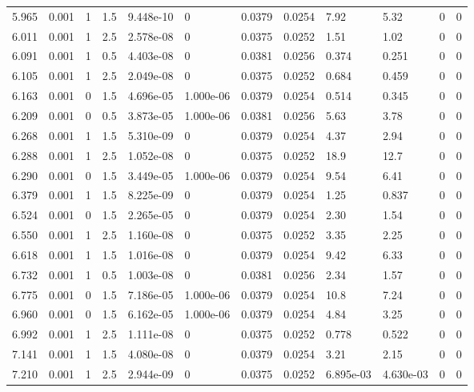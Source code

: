 \documentclass[preview]{standalone}
\begin{document}
{{{\begin{tabular}{L{1.2cm}C{1.2cm} C{0.3cm}C{0.5cm} C{1.4cm}C{1.4cm} C{1.4cm}C{1.4cm} C{1.6cm}C{1.6cm} C{1.6cm}C{1.6cm}}
  5.965  &  0.001  & 1     & 1.5 &  9.448e-10  & 0  &  0.0379&   0.0254& 7.92 & 5.32   &  0 & 0  \\ 
  6.011  &  0.001  & 1     & 2.5 &  2.578e-08  & 0  &  0.0375&   0.0252& 1.51 & 1.02   &  0 & 0  \\ 
  6.091  &  0.001  & 1     & 0.5 &  4.403e-08  & 0  &  0.0381&   0.0256& 0.374 & 0.251   &  0 & 0  \\ 
  6.105  &  0.001  & 1     & 2.5 &  2.049e-08  & 0  &  0.0375&   0.0252& 0.684 & 0.459   &  0 & 0  \\ 
  6.163  &  0.001  & 0     & 1.5 &  4.696e-05  & 1.000e-06  &  0.0379&   0.0254& 0.514 & 0.345   &  0 & 0  \\ 
  6.209  &  0.001  & 0     & 0.5 &  3.873e-05  & 1.000e-06  &  0.0381&   0.0256& 5.63 & 3.78   &  0 & 0  \\ 
  6.268  &  0.001  & 1     & 1.5 &  5.310e-09  & 0  &  0.0379&   0.0254& 4.37 & 2.94   &  0 & 0  \\ 
  6.288  &  0.001  & 1     & 2.5 &  1.052e-08  & 0  &  0.0375&   0.0252& 18.9 & 12.7   &  0 & 0  \\ 
  6.290  &  0.001  & 0     & 1.5 &  3.449e-05  & 1.000e-06  &  0.0379&   0.0254& 9.54 & 6.41   &  0 & 0  \\ 
  6.379  &  0.001  & 1     & 1.5 &  8.225e-09  & 0  &  0.0379&   0.0254& 1.25 & 0.837   &  0 & 0  \\ 
  6.524  &  0.001  & 0     & 1.5 &  2.265e-05  & 0  &  0.0379&   0.0254& 2.30 & 1.54   &  0 & 0  \\ 
  6.550  &  0.001  & 1     & 2.5 &  1.160e-08  & 0  &  0.0375&   0.0252& 3.35 & 2.25   &  0 & 0  \\ 
  6.618  &  0.001  & 1     & 1.5 &  1.016e-08  & 0  &  0.0379&   0.0254& 9.42 & 6.33   &  0 & 0  \\ 
  6.732  &  0.001  & 1     & 0.5 &  1.003e-08  & 0  &  0.0381&   0.0256& 2.34 & 1.57   &  0 & 0  \\ 
  6.775  &  0.001  & 0     & 1.5 &  7.186e-05  & 1.000e-06  &  0.0379&   0.0254& 10.8 & 7.24   &  0 & 0  \\ 
  6.960  &  0.001  & 0     & 1.5 &  6.162e-05  & 1.000e-06  &  0.0379&   0.0254& 4.84 & 3.25   &  0 & 0  \\ 
  6.992  &  0.001  & 1     & 2.5 &  1.111e-08  & 0  &  0.0375&   0.0252& 0.778 & 0.522   &  0 & 0  \\ 
  7.141  &  0.001  & 1     & 1.5 &  4.080e-08  & 0  &  0.0379&   0.0254& 3.21 & 2.15   &  0 & 0  \\ 
  7.210  &  0.001  & 1     & 2.5 &  2.944e-09  & 0  &  0.0375&   0.0252& 6.895e-03 & 4.630e-03   &  0 & 0  \\ 

\end{tabular}}}}
\end{document}
